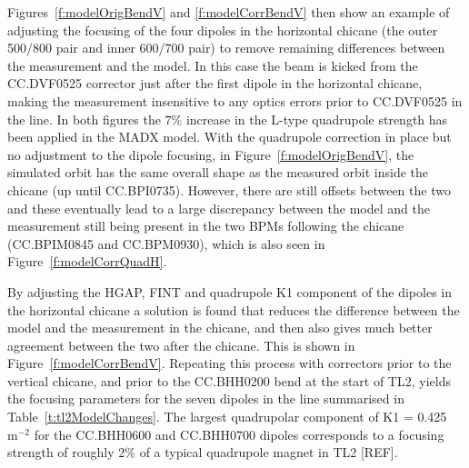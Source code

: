 Figures~\ref{f:modelOrigBendV} and \ref{f:modelCorrBendV} then show an example of adjusting the focusing of the four dipoles in the horizontal chicane (the outer 500/800 pair and inner 600/700 pair) to remove remaining differences between the measurement and the model. In this case the beam is kicked from the CC.DVF0525 corrector just after the first dipole in the horizontal chicane, making the measurement insensitive to any optics errors prior to CC.DVF0525 in the line. In both figures the \(7\%\) increase in the L-type quadrupole strength has been applied in the MADX model. With the quadrupole correction in place but no adjustment to the dipole focusing, in Figure~\ref{f:modelOrigBendV}, the simulated orbit has the same overall shape as the measured orbit inside the chicane (up until CC.BPI0735). However, there are still offsets between the two and these eventually lead to a large discrepancy between the model and the measurement still being present in the two BPMs following the chicane (CC.BPIM0845 and CC.BPM0930), which is also seen in Figure~\ref{f:modelCorrQuadH}. 

By adjusting the HGAP, FINT and quadrupole K1 component of the dipoles in the horizontal chicane a solution is found that reduces the difference between the model and the measurement in the chicane, and then also gives much better agreement between the two after the chicane. This is shown in Figure~\ref{f:modelCorrBendV}. Repeating this process with correctors prior to the vertical chicane, and prior to the CC.BHH0200 bend at the start of TL2, yields the focusing parameters for the seven dipoles in the line summarised in Table~\ref{t:tl2ModelChanges}. The largest quadrupolar component of K1 = 0.425~\(\mathrm{m^{-2}}\) for the CC.BHH0600 and CC.BHH0700 dipoles corresponds to a focusing strength of roughly \(2\%\) of a typical quadrupole magnet in TL2 [REF].

